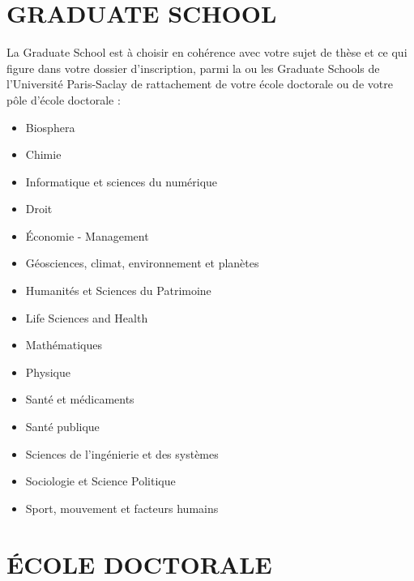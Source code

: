 \documentclass[french,12pt,a4paper]{book}
\begin{document}
\section{GRADUATE SCHOOL}
La Graduate School est à choisir en cohérence avec votre sujet de thèse et ce qui figure dans votre dossier d’inscription, parmi la ou les Graduate Schools de l’Université Paris-Saclay de rattachement de votre école doctorale ou de votre pôle d’école doctorale :

\begin{itemize}
\renewcommand{\labelitemi}{$\bullet$}
\item Biosphera
\item Chimie
\item Informatique et sciences du numérique
\item Droit
\item Économie - Management
\item Géosciences, climat, environnement et planètes
\item Humanités et Sciences du Patrimoine
\item Life Sciences and Health
\item Mathématiques
\item Physique
\item Santé et médicaments
\item Santé publique
\item Sciences de l’ingénierie et des systèmes
\item Sociologie et Science Politique
\item Sport, mouvement et facteurs humains
\end{itemize}

\section{ÉCOLE DOCTORALE}
\end{document}
